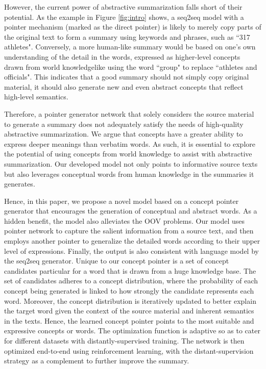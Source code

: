 \documentclass[11pt,a4paper]{article}
\begin{document}
However, the current power of abstractive summarization falls short of their potential. As the example in Figure \ref{fig:intro} shows, a seq2seq model with a pointer mechanism (marked as the direct pointer) is likely to merely copy parts of the original text to form a summary using keywords and phrases, such as ``317 athletes". 
Conversely,  a more human-like summary would be based on one's own understanding of the detail in the words, expressed as higher-level concepts drawn from world knowledge\textemdash like using the word ``group" to replace ``athletes and officials".
 This indicates that a good summary should not simply copy original material, it should also generate new and even abstract concepts that reflect high-level semantics. 




Therefore, a pointer generator network that solely considers the source material to generate a summary does not adequately satisfy the needs of high-quality  abstractive summarization. We argue that  concepts have a greater ability to  express deeper meanings  than verbatim words. 
As such, it is essential to explore the potential of using concepts from world knowledge to assist with abstractive summarization. 
Our developed model not only points to informative source texts but also  leverages conceptual words from human knowledge in the summaries it generates.  



Hence, in this paper, we propose a novel model based on a concept  pointer generator that  encourages the generation of conceptual and abstract words. As a hidden benefit, the model also alleviates the OOV problems. Our model uses pointer network to capture the salient information from a source text, and then employs another pointer to generalize the detailed words according to their upper level of expressions. Finally, the output is also consistent with language model by the seq2seq generator. 
Unique to our concept pointer is a set of concept candidates particular for a word that is drawn from a huge knowledge base. The set of candidates adheres to a concept distribution, where the probability of each concept being generated is linked to how strongly the candidate represents each word. 
Moreover, the concept distribution is iteratively  updated to better explain the target word given the context of the source material and inherent semantics in the texts. Hence, the learned concept pointer points to the most suitable and expressive concepts or words. The optimization function is adaptive so as to cater for different datasets with distantly-supervised training. The network is then optimized end-to-end using reinforcement learning, with the distant-supervision strategy as a complement to further improve the summary.
\end{document}
